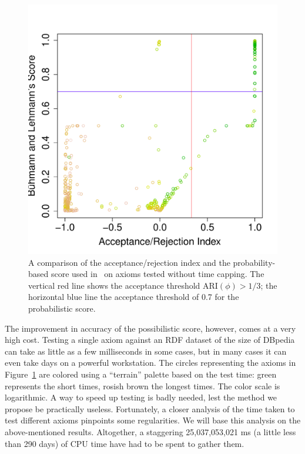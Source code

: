 \documentclass{sig-alternate}
\begin{document}
\begin{figure}[t]
\begin{center}
  \includegraphics[height=\plotheight]{ARI-BLS}
\end{center}
\caption{A comparison of the acceptance/rejection index and the probability-based
  score used in~\cite{BuehmannLehmann2012} on axioms tested without time capping.
  The vertical red line shows the acceptance threshold $\mathrm{ARI}(\phi)>1/3$;
  the horizontal blue line the acceptance threshold of 0.7 for the probabilistic score.}
\label{fig:ARI-BLS}
\end{figure}

The improvement in accuracy of the possibilistic score, however, comes at a very high cost.
Testing a single axiom against an RDF dataset of the size of DBpedia can take
as little as a few milliseconds in some cases, but in many cases it can even take
days on a powerful workstation. The circles representing the axioms in Figure~\ref{fig:ARI-BLS}
are colored using a ``terrain'' palette based on the test time: green represents
the short times, rosish brown the longest times. The color scale is logarithmic.
A way to speed up testing is badly needed, lest the method we propose be practically useless.
Fortunately, a closer analysis of the time taken to test different axioms
pinpoints some regularities. We will base this analysis on the above-mentioned results.
Altogether, a staggering 25,037,053,021 ms (a little less than 290 days)
of CPU time have had to be spent to gather them.
\end{document}
